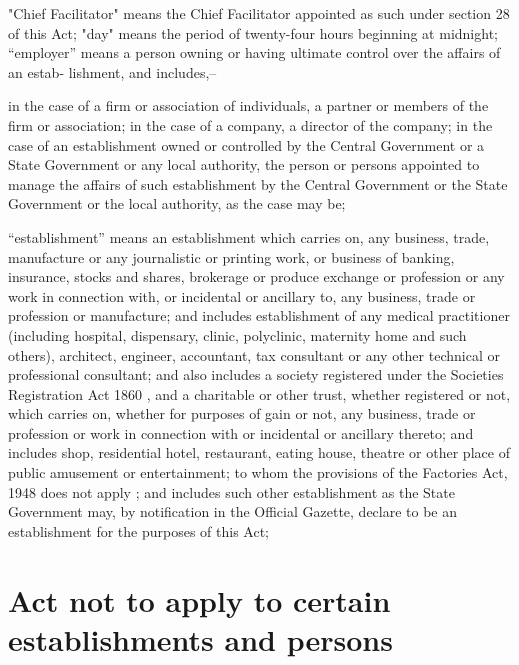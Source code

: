 \documentclass[gaz8,ordinance]{mhact}
\begin{document}
      \begin{subsectionlist}
    
     "Chief Facilitator" means the Chief Facilitator appointed as such 
under section 28 of this Act; 
     "day" means the period of twenty-four hours beginning at midnight;
     “employer” means a person owning or having ultimate control over the affairs of an estab- 
lishment, and includes,–
      \begin{clause}
    
     in the case of a firm or association of individuals, a partner or members of the firm 
or association;
     in the case of a company, a director of the company;
     in the case of an establishment owned or controlled by the Central Government or a 
State Government or any local authority, the person or persons appointed to manage 
the affairs of such establishment by the Central Government or the State Government 
or the local authority, as the case may be;
       \end{clause}
    
     “establishment” means an establishment which carries on, any business, trade, manufacture or any journalistic or printing work, or business of banking, insurance, stocks and 
shares, brokerage or produce exchange or profession or any work in connection with, or 
incidental or ancillary to, any business, trade or profession or manufacture; and includes 
establishment of any medical practitioner (including hospital, dispensary, clinic, polyclinic, 
maternity home and such others), architect, engineer, accountant, tax consultant or any 
other technical or professional consultant; and also includes a society registered under the 
Societies Registration Act 1860 
   , and a charitable or other trust, whether registered or not, 
which carries on, whether for purposes of gain or not, any business, trade or profession or 
work in connection with or incidental or ancillary thereto; and includes shop, residential 
hotel, restaurant, eating house, theatre or other place of public amusement or entertainment; to whom the provisions of the Factories Act, 1948 
   does not apply ; and includes such 
other establishment as the State Government may, by notification in the Official Gazette, 
declare to be an establishment for the purposes of this Act;
       \end{subsectionlist}
    
        \section{Act not to apply to certain establishments and persons} 
        
\end{document}
